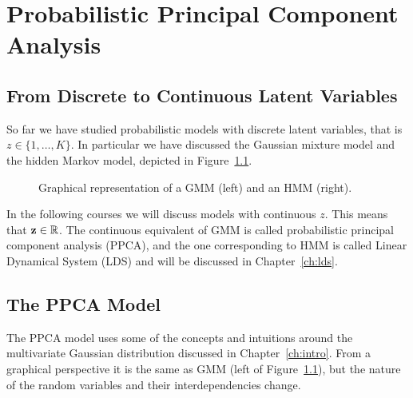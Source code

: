 \chapter{Probabilistic Principal Component Analysis}
\label{ch:ppca}

\section{From Discrete to Continuous Latent Variables}
So far we have studied probabilistic models with discrete latent variables, that is $z\in\{1,\ldots,K\}$. In particular we have discussed the Gaussian mixture model and the hidden Markov model, depicted in Figure~\ref{fig:gmm-hmm}.
\begin{figure}[H]
 \centering
 \hspace{2cm}
 \caption{Graphical representation of a GMM (left) and an HMM (right). \label{fig:gmm-hmm}}
\end{figure}

In the following courses we will discuss models with continuous $z$. This means that $\boldsymbol{\mathbf{z}}\in\mathbb{R}$. The continuous equivalent of GMM is called probabilistic principal component analysis (PPCA), and the one corresponding to HMM is called Linear Dynamical System (LDS) and will be discussed in Chapter~\ref{ch:lds}.

\section{The PPCA Model}
The PPCA model uses some of the concepts and intuitions around the multivariate Gaussian distribution discussed in Chapter~\ref{ch:intro}. From a graphical perspective it is the same as GMM (left of Figure~\ref{fig:gmm-hmm}), but the nature of the random variables and their interdependencies change. \vspace{3mm}

